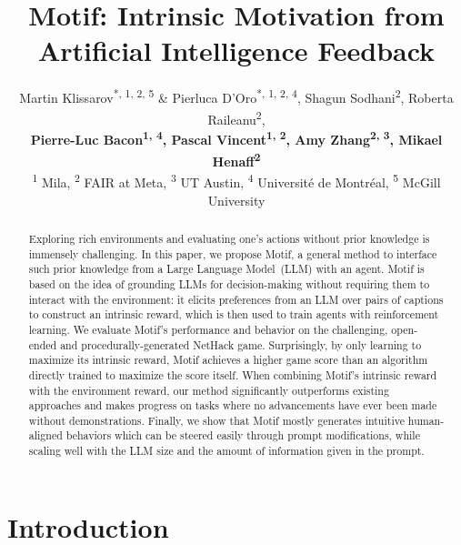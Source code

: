 \documentclass{article} %
\title{Motif: Intrinsic Motivation from \\ Artificial Intelligence Feedback}
\author{Martin Klissarov\textsuperscript{*, 1, 2, 5} \& Pierluca D'Oro\textsuperscript{*, 1, 2, 4},  Shagun Sodhani\textsuperscript{2}, Roberta Raileanu\textsuperscript{2}, \\
\textbf{Pierre-Luc Bacon\textsuperscript{1, 4}, Pascal Vincent\textsuperscript{1, 2}, Amy Zhang\textsuperscript{2, 3}, Mikael Henaff\textsuperscript{2}} \\
\textsuperscript{1} Mila, \textsuperscript{2} FAIR at Meta, \textsuperscript{3} UT Austin, \textsuperscript{4} Université de Montréal, 
\textsuperscript{5} McGill University
}
\begin{document}
\let\thefootnote\relax{}

\doparttoc %
\faketableofcontents %

\maketitle
\vspace{-0.6cm}
\begin{abstract}
Exploring rich environments and evaluating one's actions without prior knowledge is immensely challenging.
In this paper, we propose Motif, a general method to interface such prior knowledge from a Large Language Model~(LLM) with an agent. 
Motif is based on the idea of grounding LLMs for decision-making without requiring them to interact with the environment:
it elicits preferences from an LLM over pairs of captions to construct an intrinsic reward, which is then used to train agents with reinforcement learning.
We evaluate Motif's performance and behavior on the challenging, open-ended and procedurally-generated NetHack game.
Surprisingly, by only learning to maximize its intrinsic reward, Motif achieves a higher game score than an algorithm directly trained to maximize the score itself.
When combining Motif's intrinsic reward with the environment reward, our method significantly outperforms existing 
approaches and  
makes progress on tasks where no advancements have ever been made without demonstrations.
Finally, we show that Motif mostly generates intuitive human-aligned behaviors which can be steered easily through prompt modifications, while scaling well with the LLM size and the amount of information given in the prompt.


\end{abstract}
\vspace{-0.4cm}
\section{Introduction}
\end{document}
